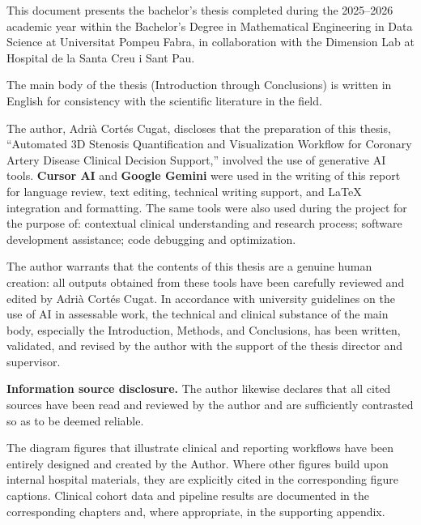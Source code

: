 
\noindent
This document presents the bachelor's thesis completed during the 2025--2026 academic year within the Bachelor's Degree in Mathematical Engineering in Data Science at Universitat Pompeu Fabra, in collaboration with the Dimension Lab at Hospital de la Santa Creu i Sant Pau.

\vspace{0.5em}
\noindent
The main body of the thesis (Introduction through Conclusions) is written in English for consistency with the scientific literature in the field.

\vspace{2em}

\noindent
The author, Adri\`{a} Cort\'{e}s Cugat, discloses that the preparation of this thesis, ``Automated 3D Stenosis Quantification and Visualization Workflow for Coronary Artery Disease Clinical Decision Support,'' involved the use of generative AI tools. \textbf{Cursor AI} and \textbf{Google Gemini} were used in the writing of this report for language review, text editing, technical writing support, and \LaTeX{} integration and formatting. The same tools were also used during the project for the purpose of: contextual clinical understanding and research process; software development assistance; code debugging and optimization.

\vspace{0.5em}
\noindent
The author warrants that the contents of this thesis are a genuine human creation: all outputs obtained from these tools have been carefully reviewed and edited by Adri\`{a} Cort\'{e}s Cugat. In accordance with university guidelines on the use of AI in assessable work, the technical and clinical substance of the main body, especially the Introduction, Methods, and Conclusions, has been written, validated, and revised by the author with the support of the thesis director and supervisor.

\vspace{0.5em}
\noindent
\textbf{Information source disclosure.} The author likewise declares that all cited sources have been read and reviewed by the author and are sufficiently contrasted so as to be deemed reliable.

\vspace{2em}

\noindent
The diagram figures that illustrate clinical and reporting workflows have been entirely designed and created by the Author. Where other figures build upon internal hospital materials, they are explicitly cited in the corresponding figure captions. Clinical cohort data and pipeline results are documented in the corresponding chapters and, where appropriate, in the supporting appendix.
